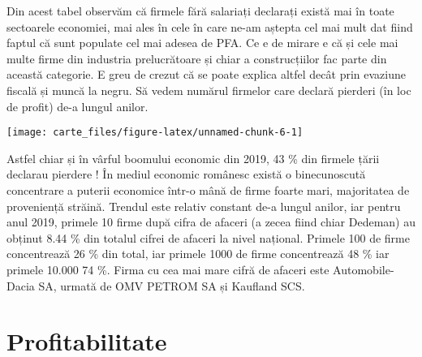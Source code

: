 \documentclass[
]{book}
\begin{document}
Din acest tabel observăm că firmele fără salariați declarați există mai în toate sectoarele economiei, mai ales în cele în care ne-am aștepta cel mai mult dat fiind faptul că sunt populate cel mai adesea de PFA. Ce e de mirare e că și cele mai multe firme din industria prelucrătoare și chiar a construcțiilor fac parte din această categorie. E greu de crezut că se poate explica altfel decât prin evaziune fiscală și muncă la negru. Să vedem numărul firmelor care declară pierderi (în loc de profit) de-a lungul anilor.

\begin{center}\texttt{[image: carte\_files/figure-latex/unnamed-chunk-6-1]} \end{center}

Astfel chiar și în vârful boomului economic din 2019, 43 \% din firmele țării declarau pierdere !
În mediul economic românesc există o binecunoscută concentrare a puterii economice într-o mână de firme foarte mari, majoritatea de proveniență străină. Trendul este relativ constant de-a lungul anilor, iar pentru anul 2019, primele 10 firme după cifra de afaceri (a zecea fiind chiar Dedeman) au obținut 8.44 \% din totalul cifrei de afaceri la nivel național. Primele 100 de firme concentrează 26 \% din total, iar primele 1000 de firme concentrează 48 \% iar primele 10.000 74 \%.
Firma cu cea mai mare cifră de afaceri este Automobile-Dacia SA, urmată de OMV PETROM SA și Kaufland SCS.

\hypertarget{intro}{%
\chapter{Profitabilitate}\label{intro}}
\end{document}
